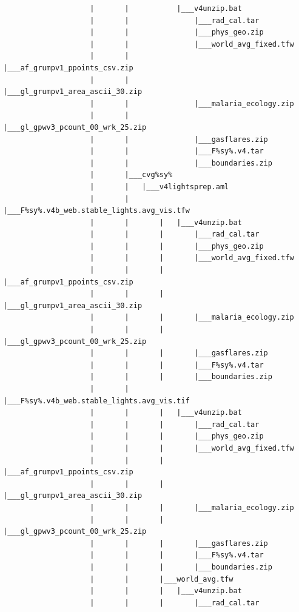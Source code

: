 \documentclass[
]{book}
\begin{document}
\begin{verbatim}
                    |       |           |___v4unzip.bat
                    |       |               |___rad_cal.tar
                    |       |               |___phys_geo.zip
                    |       |               |___world_avg_fixed.tfw
                    |       |               |___af_grumpv1_ppoints_csv.zip
                    |       |               |___gl_grumpv1_area_ascii_30.zip
                    |       |               |___malaria_ecology.zip
                    |       |               |___gl_gpwv3_pcount_00_wrk_25.zip
                    |       |               |___gasflares.zip
                    |       |               |___F%sy%.v4.tar
                    |       |               |___boundaries.zip
                    |       |___cvg%sy%
                    |       |   |___v4lightsprep.aml
                    |       |       |___F%sy%.v4b_web.stable_lights.avg_vis.tfw
                    |       |       |   |___v4unzip.bat
                    |       |       |       |___rad_cal.tar
                    |       |       |       |___phys_geo.zip
                    |       |       |       |___world_avg_fixed.tfw
                    |       |       |       |___af_grumpv1_ppoints_csv.zip
                    |       |       |       |___gl_grumpv1_area_ascii_30.zip
                    |       |       |       |___malaria_ecology.zip
                    |       |       |       |___gl_gpwv3_pcount_00_wrk_25.zip
                    |       |       |       |___gasflares.zip
                    |       |       |       |___F%sy%.v4.tar
                    |       |       |       |___boundaries.zip
                    |       |       |___F%sy%.v4b_web.stable_lights.avg_vis.tif
                    |       |       |   |___v4unzip.bat
                    |       |       |       |___rad_cal.tar
                    |       |       |       |___phys_geo.zip
                    |       |       |       |___world_avg_fixed.tfw
                    |       |       |       |___af_grumpv1_ppoints_csv.zip
                    |       |       |       |___gl_grumpv1_area_ascii_30.zip
                    |       |       |       |___malaria_ecology.zip
                    |       |       |       |___gl_gpwv3_pcount_00_wrk_25.zip
                    |       |       |       |___gasflares.zip
                    |       |       |       |___F%sy%.v4.tar
                    |       |       |       |___boundaries.zip
                    |       |       |___world_avg.tfw
                    |       |       |   |___v4unzip.bat
                    |       |       |       |___rad_cal.tar

\end{verbatim}
\end{document}
